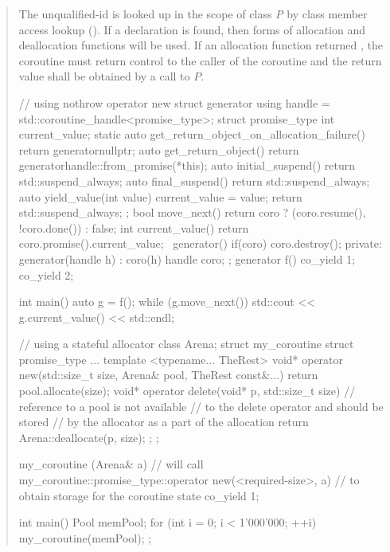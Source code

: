 \begin{quote}
\pnum
The unqualified-id  is looked up in the scope of class \textit{P}
by class member access lookup (). If a declaration is found,
 then  forms of allocation and deallocation functions will be used. If an allocation function returned , the coroutine must return control to the caller of the coroutine and the return value shall be obtained by a call to $P$.

\enterexample
\begin{codeblock}
// using nothrow operator new
struct generator {
  using handle = std::coroutine_handle<promise_type>;
  struct promise_type {
    int current_value;
    static auto get_return_object_on_allocation_failure() { return generator{nullptr}; }
    auto get_return_object() { return generator{handle::from_promise(*this)}; }
    auto initial_suspend() { return std::suspend_always{}; }
    auto final_suspend() { return std::suspend_always{}; }
    auto yield_value(int value) { 
      current_value = value; 
      return std::suspend_always{};
    }
  };
  bool move_next() { return coro ? (coro.resume(), !coro.done()) : false; }
  int current_value() { return coro.promise().current_value; }
  ~generator() { if(coro) coro.destroy(); }
private:
  generator(handle h) : coro(h) {}
  handle coro;
};
generator f() { co_yield 1;  co_yield 2; }
 
int main() {
  auto g = f();
  while (g.move_next()) std::cout << g.current_value() << std::endl;
}

\end{codeblock}
\exitexample

\pnum
\enterexample
\begin{codeblock}
  // using a stateful allocator
  class Arena;
  struct my_coroutine {
    struct promise_type {
      ...
      template <typename... TheRest>
      void* operator new(std::size_t size, Arena& pool, TheRest const&...) {
        return pool.allocate(size);
      }
      void* operator delete(void* p, std::size_t size) {
      	// reference to a pool is not available
      	// to the delete operator and should be stored
      	// by the allocator as a part of the allocation
        return Arena::deallocate(p, size);
      }
    };
  };
  
  my_coroutine (Arena& a) {
    // will call my_coroutine::promise_type::operator new(<required-size>, a)
    // to obtain storage for the coroutine state
    co_yield 1;
  }
  
  int main() {
    Pool memPool;
    for (int i = 0; i < 1'000'000; ++i) my_coroutine(memPool);
  };
\end{codeblock}
\exitexample
\end{quote}